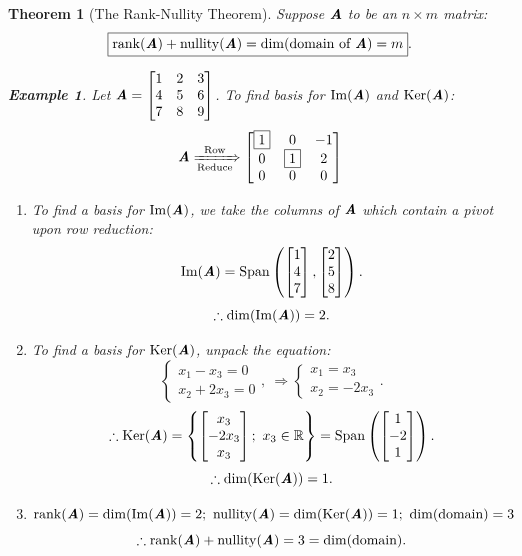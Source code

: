 \documentclass[12pt, a4paper]{article}
\newtheorem{thm}{Theorem}[subsection]
\newtheorem{eg}{Example}[subsection]
\def\R{{\mathbb{R}}}
\def\IM{{\mathrm{Im}}}
\def\Span{\mathrm{Span}}
\def\Ker{\mathrm{Ker}}
\def\rank{\mathrm{rank}}
\def\nullity{\mathrm{nullity}}
\def\matrixA{\textbf{\emph{A}}}
\begin{document}
\begin{thm}[The Rank-Nullity Theorem]
	Suppose $\matrixA$ to be an $n\times m$ matrix: \[\boxed{\rank(\matrixA)+\nullity(\matrixA)=\dim(\text{domain of }\matrixA)=m}.\]	
	\begin{eg}
		Let $\matrixA=\begin{bmatrix}1&2&3\\4&5&6\\7&8&9\end{bmatrix}$. To find basis for $\IM(\matrixA)$ and $\Ker(\matrixA)$: \[\matrixA\xRightarrow[\text{Reduce}]{\text{Row}}\begin{bmatrix}\boxed{1}&0&-1\\0&\boxed{1}&2\\0&0&0\end{bmatrix}\]
		\begin{enumerate}
			\item To find a basis for $\IM(\matrixA)$, we take the columns of $\matrixA$ which contain a pivot upon row reduction: \[\IM(\matrixA)=\Span\left(\begin{bmatrix}1\\4\\7\end{bmatrix},\begin{bmatrix}2\\5\\8\end{bmatrix}\right).\]\[\therefore\dim(\IM(\matrixA))=2.\]
			\item 	To find a basis for $\Ker(\matrixA)$, unpack the equation: \[\begin{cases}x_1-x_3=0\\x_2+2x_3=0\end{cases},\ \Longrightarrow\begin{cases}x_1=x_3\\x_2=-2x_3\end{cases}.\]
			\[\therefore \Ker(\matrixA)=\left\{\begin{bmatrix}x_3\\-2x_3\\x_3\end{bmatrix};\ x_3\in\R\right\}=\Span\left(\begin{bmatrix}1\\-2\\1\end{bmatrix}\right).\]
			\[\therefore\dim(\Ker(\matrixA))=1.\]
			\item $\rank(\matrixA)=\dim(\IM(\matrixA))=2;\ \nullity(\matrixA)=\dim(\Ker(\matrixA))=1;\ \dim(\text{domain})=3$\[\therefore\rank(\matrixA)+\nullity(\matrixA)=3=\dim(\text{domain}).\]
		\end{enumerate}
	\end{eg}
	

\end{thm}
\end{document}
